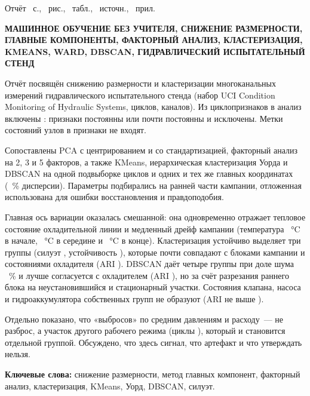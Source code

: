 \documentclass[14pt,a4paper]{extarticle}
\begin{document}
\noindent Отчёт \pageref{LastPage}~с., \NFig~рис., \NTab~табл., \NSrc~источн.,
\NApp~прил.

\vspace{2mm}
\noindent\textbf{МАШИННОЕ ОБУЧЕНИЕ БЕЗ УЧИТЕЛЯ, СНИЖЕНИЕ РАЗМЕРНОСТИ,
ГЛАВНЫЕ КОМПОНЕНТЫ, ФАКТОРНЫЙ АНАЛИЗ, КЛАСТЕРИЗАЦИЯ, KMEANS, WARD, DBSCAN,
ГИДРАВЛИЧЕСКИЙ ИСПЫТАТЕЛЬНЫЙ СТЕНД}

\vspace{4mm}
\noindent
Отчёт посвящён снижению размерности и кластеризации многоканальных измерений
гидравлического испытательного стенда (набор UCI Condition Monitoring of
Hydraulic Systems, \DataCycles{} циклов, \DataChannels{} каналов). Из
\DataFeaturesAll{} циклопризнаков в анализ включены \DataFeaturesUsed{}:
признаки \DataNearConstantList{} постоянны или почти постоянны и исключены.
Метки состояний узлов в признаки не входят.

Сопоставлены PCA с центрированием и со стандартизацией, факторный анализ на
2, 3 и 5 факторов, а также KMeans, иерархическая кластеризация Уорда и
DBSCAN на одной подвыборке \ClustN{} циклов и одних и тех же
\ClustPcs{} главных координатах (\ClustSharePct~\% дисперсии). Параметры
подбирались на ранней части кампании, отложенная использована для ошибки
восстановления и правдоподобия.

Главная ось вариации оказалась смешанной: она одновременно отражает тепловое
состояние охладительной линии и медленный дрейф кампании (температура
\DriftTsOneEarly~°C в начале, \DriftTsOneMid~°C в середине и
\DriftTsOneLate~°C в конце). Кластеризация устойчиво выделяет три группы
(силуэт \KmSil, устойчивость \KmStab), которые почти совпадают с блоками
кампании и состояниями охладителя (ARI \KmAriCooler). DBSCAN даёт четыре
группы при доле шума \DbNoise~\% и лучше согласуется с охладителем
(ARI \DbAriCooler), но за счёт разрезания раннего блока на неустановившийся и
стационарный участки. Состояния клапана, насоса и гидроаккумулятора
собственных групп не образуют (ARI не выше \KmAriPump).

Отдельно показано, что \DataHighPressN{} «выбросов» по средним давлениям и
расходу~--- не разброс, а участок другого рабочего режима
(циклы \DataHighPressRange), который и становится отдельной группой.
Обсуждено, что здесь сигнал, что артефакт и что утверждать нельзя.

\vspace{2mm}
\noindent\textbf{Ключевые слова:} снижение размерности, метод главных
компонент, факторный анализ, кластеризация, KMeans, Уорд, DBSCAN, силуэт.
\end{document}

